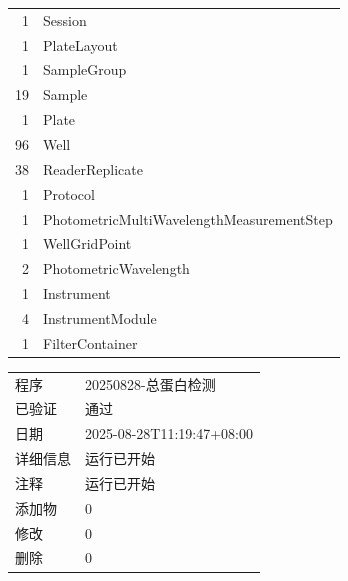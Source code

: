 \documentclass[UTF8,10pt,a4paper,fontset=fandol]{ctexart}
\newcommand{\fieldvalue}[1]{#1}
\begin{document}
\begin{tabular}{r l}
\fieldvalue{1} & Session\\
\fieldvalue{1} & PlateLayout\\
\fieldvalue{1} & SampleGroup\\
\fieldvalue{19} & Sample\\
\fieldvalue{1} & Plate\\
\fieldvalue{96} & Well\\
\fieldvalue{38} & ReaderReplicate\\
\fieldvalue{1} & Protocol\\
\fieldvalue{1} & PhotometricMultiWavelengthMeasurementStep\\
\fieldvalue{1} & WellGridPoint\\
\fieldvalue{2} & PhotometricWavelength\\
\fieldvalue{1} & Instrument\\
\fieldvalue{4} & InstrumentModule\\
\fieldvalue{1} & FilterContainer\\
\end{tabular}

\vspace{0.5em}

\begin{tabular}{p{2.2cm}p{11cm}}
程序&
\fieldvalue{20250828-总蛋白检测}\\
已验证&
\fieldvalue{通过}\\
日期&
\fieldvalue{2025-08-28T11:19:47+08:00}\\
详细信息&
\fieldvalue{运行已开始}\\
注释&
\fieldvalue{运行已开始}\\
添加物&
\fieldvalue{0}\\
修改&
\fieldvalue{0}\\
删除&
\fieldvalue{0}\\
\end{tabular}
\end{document}
